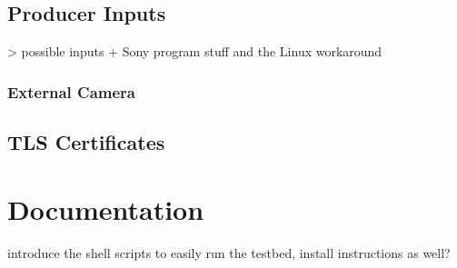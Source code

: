 \subsection{Producer Inputs\label{sec:producer_inputs}}

> possible inputs + Sony program stuff and the Linux workaround

\subsubsection{External Camera\label{sec:ext_cam}}

\subsection{TLS Certificates}


\section{Documentation\label{sec:docu}}

introduce the shell scripts to easily run the testbed, install instructions as well?
